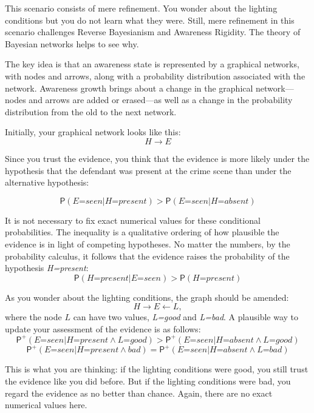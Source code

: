 \documentclass[
  11pt,
  dvipsnames,enabledeprecatedfontcommands]{scrartcl}
\newcommand{\pr}[1]{\ensuremath{\mathsf{P}(#1)}}
\newcommand{\ppr}[2]{\ensuremath{\mathsf{P}^{#1}(#2)}}
\begin{document}
\noindent This scenario consists of mere refinement. You wonder about
the lighting conditions but you do not learn what they were. Still, mere
refinement in this scenario challenges Reverse Bayesianism and Awareness
Rigidity. The theory of Bayesian networks helps to see why.

The key idea is that an awareness state is represented by a graphical
networks, with nodes and arrows, along with a probability distribution
associated with the network. Awareness growth brings about a change in
the graphical network---nodes and arrows are added or erased---as well
as a change in the probability distribution from the old to the next
network.

Initially, your graphical network looks like this: \[H \rightarrow E\]

\noindent Since you trust the evidence, you think that the evidence is
more likely under the hypothesis that the defendant was present at the
crime scene than under the alternative hypothesis:

\[\pr{\textit{E=seen} \vert \textit{H=present}} > \pr{\textit{E=seen} \vert \textit{H=absent}}\]

\noindent It is not necessary to fix exact numerical values for these
conditional probabilities. The inequality is a qualitative ordering of
how plausible the evidence is in light of competing hypotheses. No
matter the numbers, by the probability calculus, it follows that the
evidence raises the probability of the hypothesis \textit{H=present}:
\[\pr{\textit{H=present}\vert \textit{E=seen}} > \pr{\textit{H=present}}\]

\noindent As you wonder about the lighting conditions, the graph should
be amended: \[H \rightarrow E \leftarrow L,\] where the node \(L\) can
have two values, \textit{L=good} and \textit{L=bad}. A plausible way to
update your assessment of the evidence is as follows:
\[\ppr{+}{\textit{E=seen} \vert \textit{H=present} \wedge \textit{L=good}} > \ppr{+}{\textit{E=seen} \vert \textit{H=absent} \wedge \textit{L=good}}\]
\[\ppr{+}{\textit{E=seen} \vert \textit{H=present} \wedge \textit{bad}} = \ppr{+}{\textit{E=seen} \vert \textit{H=absent} \wedge \textit{L=bad}}\]

\noindent This is what you are thinking: if the lighting conditions were
good, you still trust the evidence like you did before. But if the
lighting conditions were bad, you regard the evidence as no better than
chance. Again, there are no exact numerical values here.
\end{document}
